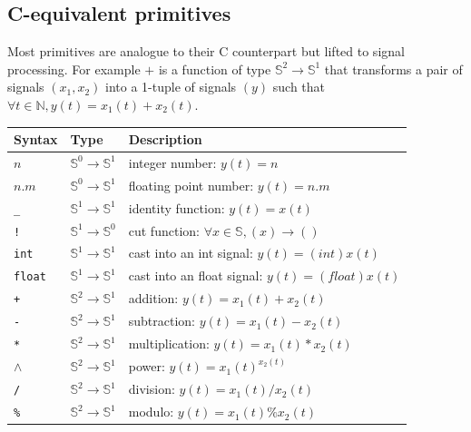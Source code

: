 \documentclass[a4paper,10pt]{book}
\begin{document}
\subsection{C-equivalent primitives}

Most \faust primitives are analogue to their C counterpart but lifted to signal processing.
For example $+$ is a function of type $\mathbb{S}^{2}\rightarrow\mathbb{S}^{1}$ that transforms a pair of signals $(x_1,x_2)$ into a 1-tuple of signals $(y)$ such that $\forall t\in\mathbb{N}, y(t)=x_{1}(t)+x_{2}(t)$.

\bigskip

\begin{tabular}{|l|l|l|}
\hline
\textbf{Syntax} & \textbf{Type}  & \textbf{Description} \\
\hline
$n$ & $\mathbb{S}^{0}\rightarrow\mathbb{S}^{1}$ & integer number: $y(t)=n$ \\
$n.m$ & $\mathbb{S}^{0}\rightarrow\mathbb{S}^{1}$ & floating point number: $y(t)=n.m$ \\

\texttt{\_} & $\mathbb{S}^{1}\rightarrow\mathbb{S}^{1}$ & identity function: $y(t)=x(t)$ \\
\texttt{!} & $\mathbb{S}^{1}\rightarrow\mathbb{S}^{0}$ & cut function: $\forall x\in\mathbb{S},(x)\rightarrow ()$\\

\texttt{int} & $\mathbb{S}^{1}\rightarrow\mathbb{S}^{1}$ & cast into an int signal: $y(t)=(int)x(t)$  \\
\texttt{float} & $\mathbb{S}^{1}\rightarrow\mathbb{S}^{1}$ & cast into an float signal: $y(t)=(float)x(t)$  \\

\texttt{+} & $\mathbb{S}^{2}\rightarrow\mathbb{S}^{1}$ & addition: $y(t)=x_{1}(t)+x_{2}(t)$  \\
\texttt{-} & $\mathbb{S}^{2}\rightarrow\mathbb{S}^{1}$ & subtraction: $y(t)=x_{1}(t)-x_{2}(t)$   \\
\texttt{*} & $\mathbb{S}^{2}\rightarrow\mathbb{S}^{1}$ & multiplication: $y(t)=x_{1}(t)*x_{2}(t)$   \\
\texttt{$\land$} & $\mathbb{S}^{2}\rightarrow\mathbb{S}^{1}$ & power: $y(t)=x_{1}(t)^{x_{2}(t)}$   \\
\texttt{/} & $\mathbb{S}^{2}\rightarrow\mathbb{S}^{1}$ & division: $y(t)=x_{1}(t)/x_{2}(t)$   \\
\texttt{\%} & $\mathbb{S}^{2}\rightarrow\mathbb{S}^{1}$ & modulo: $y(t)=x_{1}(t)\%x_{2}(t)$   \\


\end{tabular}
\end{document}
